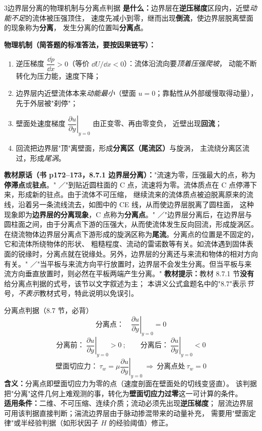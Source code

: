 \begin{kaodian}{3}{边界层分离的物理机制与分离点判据}
\textbf{是什么：}边界层在\textbf{逆压梯度}区段内，近壁\emph{动能不足}的流体被压强顶住，
速度先减小到零，继而出现\textbf{倒流}，使边界层脱离壁面的现象称为\textbf{分离}，
发生分离的位置叫\textbf{分离点}。

\textbf{物理机制（简答题的标准答法，要按因果链写）：}
\begin{enumerate}
  \item 逆压梯度 $\dfrac{\dd p}{\dd x}>0$（等价 $\dd U/\dd x<0$）：流体沿流向要\emph{顶着压强爬坡}，
        动能不断转化为压力能，速度下降；
  \item 边界层内近壁流体本来\emph{动能最小}（壁面 $u=0$；靠黏性从外部缓慢取得动量），
        先于外层被"刹停"；
  \item 壁面处速度梯度 $\left.\dfrac{\partial u}{\partial y}\right|_{y=0}$ 由正变零、再由零变负，
        近壁出现\textbf{回流}；
  \item 回流把边界层"顶"离壁面，形成\textbf{分离区（尾流区）}与旋涡，
        主流绕分离区流过，形成\emph{尾涡}。
\end{enumerate}

\textbf{教材原话（书 p172--173，8.7.1 边界层分离）：}"流速为零，压强最大的点，称为\textbf{停滞点}或\textbf{驻点}。"
／"到贴近圆柱面的 C 点，流速将为零。流体质点在 C 点停滞下来，形成新的驻点。由于流体不可压缩，
继续流来的流体质点被迫脱离原来的流线，沿着另一条流线流去，如图中的 CE 线，从而使边界层脱离了圆柱面，
这种现象即为\textbf{边界层的分离现象}，C 点称为\textbf{分离点}。"
／"边界层分离后，在边界层与圆柱面之间，由于分离点下游的压强大，从而使流体发生反向回流，形成旋涡区。
在绕流物体边界层分离点下游形成的旋涡区称为\textbf{尾流}。分离点的位置是不固定的，它和流体所绕物体的形状、
粗糙程度、流动的雷诺数等有关。如流体遇到固体表面的锐缘时，分离点就在锐缘处。另外，边界层的分离还与来流和物体的相对方向有关。"
／"当平板与来流方向平行放置时，边界层不会发生分离。但当平板与来流方向垂直放置时，则必然在平板两端产生分离。"
\textbf{教材提示：}教材 8.7.1 节\textbf{没有}给分离点判据的式号，该节以文字叙述为主；
本讲义公式盒题名中的"8.7"表示\emph{节}号，\emph{不表示}教材式号，特此说明以免误引。

\begin{gongshi}{分离点判据（8.7 节，必背）}
\[ \text{分离点：}\quad\left.\frac{\partial u}{\partial y}\right|_{y=0}=0 \]
\[ \text{分离前：}\ \left.\frac{\partial u}{\partial y}\right|_{y=0}>0\ ;\qquad
   \text{分离后：}\ \left.\frac{\partial u}{\partial y}\right|_{y=0}<0 \]
\[ \text{壁面切应力：}\ \tau_w=\mu\left.\frac{\partial u}{\partial y}\right|_{y=0}
   \ \Longrightarrow\ \text{分离点处}\ \tau_w=0 \]
\textbf{含义：}分离点即壁面切应力为零的点（速度剖面在壁面处的切线变竖直）。
该判据把"分离"这件几何上难观测的事，转化为\textbf{壁面切应力过零}这一可计算的条件。\\
\textbf{适用条件：}二维、不可压缩、连续介质；流动必须先出现\textbf{逆压梯度}；
层流边界层可用该判据直接判断；湍流边界层由于脉动掺混带来的动量补充，
需要用"壁面定律"或半经验判据（如形状因子 $H$ 的经验阈值）修正。
\end{gongshi}


\end{kaodian}
